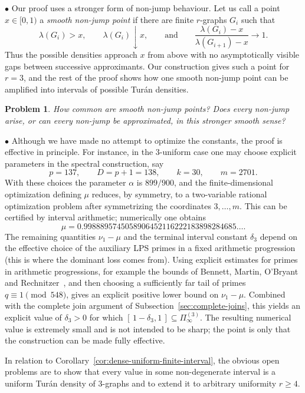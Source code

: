 \documentclass[10pt]{article}
\numberwithin{equation}{section}
\newtheorem{problem}[theorem]{Problem}
\begin{document}
\medskip 

$\bullet$ Our proof uses a stronger form of non-jump behaviour. Let us call a point $x\in[0,1)$ a \emph{smooth non-jump point} if there are finite $r$-graphs $G_i$ such that
\[
        \lambda(G_i)>x,\qquad \lambda(G_i)\downarrow x,\qquad\text{and}\qquad
        \frac{\lambda(G_i)-x}{\lambda(G_{i+1})-x}\to 1.
\]
Thus the possible densities approach $x$ from above with no asymptotically visible gaps between successive approximants. Our construction gives such a point for $r=3$, and the rest of the proof shows how one smooth non-jump point can be amplified into intervals of possible Tur\'an densities.


\begin{problem}
How common are smooth non-jump points? Does every non-jump arise, or can every non-jump be approximated, in this stronger smooth sense?
\end{problem}

\medskip 

$\bullet$ Although we have made no attempt to optimize the constants, the proof is effective in principle. For instance, in the $3$-uniform case one may choose explicit parameters in the spectral construction, say
\[
        p=137,\qquad D=p+1=138,\qquad k=30,\qquad m=2701 .
\]
With these choices the parameter $\alpha$ is $899/900$, and the finite-dimensional optimization defining $\mu$ reduces, by symmetry, to a two-variable rational optimization problem after symmetrizing the coordinates $3,\ldots,m$. This can be certified by interval arithmetic; numerically one obtains
\[
        \mu = 0.9988895745058906452116222183898284685\ldots .
\]
The remaining quantities $\nu_1-\mu$ and the terminal interval constant $\delta_3$ depend on the effective choice of the auxiliary LPS primes in a fixed arithmetic progression (this is where the dominant loss comes from). Using explicit estimates for primes in arithmetic progressions, for example the bounds of Bennett, Martin, O'Bryant and Rechnitzer~\cite{BennettMartinOBryantRechnitzer2018}, and then choosing a sufficiently far tail of primes $q\equiv 1\pmod {548}$, gives an explicit positive lower bound on $\nu_1-\mu$. Combined with the complete join argument of Subsection~\ref{sec:complete-joins}, this yields an explicit value of $\delta_3>0$ for which $[\,1-\delta_3,1\,]\subseteq \Pi_\infty^{(3)}$. 
The resulting numerical value is extremely small and is not intended to be sharp; the point is only that the construction can be made fully effective.

In relation to Corollary~\ref{cor:dense-uniform-finite-interval}, the obvious  open problems are to show that every value in some non-degenerate interval is a uniform Tur\'an density of $3$-graphs and to extend it to arbitrary uniformity $r\ge 4$.
\end{document}
